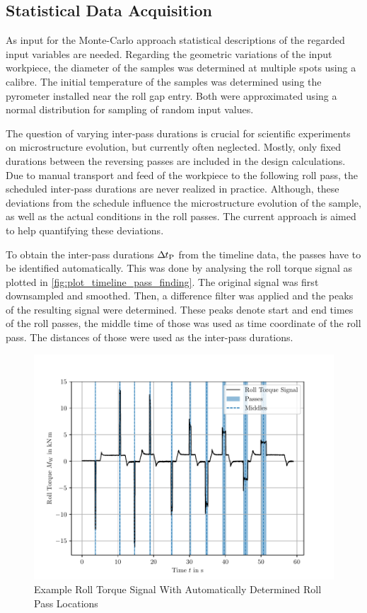 \subsection{Statistical Data Acquisition}\label{subsec:data-acquisition}

As input for the Monte-Carlo approach statistical descriptions of the regarded input variables are needed.
Regarding the geometric variations of the input workpiece, the diameter of the samples was determined at multiple spots using a calibre.
The initial temperature of the samples was determined using the pyrometer installed near the roll gap entry.
Both were approximated using a normal distribution for sampling of random input values.

The question of varying inter-pass durations is crucial for scientific experiments on microstructure evolution, but currently often neglected.
Mostly, only fixed durations between the reversing passes are included in the design calculations.
Due to manual transport and feed of the workpiece to the following roll pass, the scheduled inter-pass durations are never realized in practice.
Although, these deviations from the schedule influence the microstructure evolution of the sample, as well as the actual conditions in the roll passes.
The current approach is aimed to help quantifying these deviations.

To obtain the inter-pass durations ${{\Delta\mspace{-1mu}t}_\mathrm{P}}$ from the timeline data, the passes have to be identified automatically.
This was done by analysing the roll torque signal as plotted in \autoref{fig:plot_timeline_pass_finding}.
The original signal was first downsampled and smoothed.
Then, a difference filter was applied and the peaks of the resulting signal were determined.
These peaks denote start and end times of the roll passes, the middle time of those was used as time coordinate of the roll pass.
The distances of those were used as the inter-pass durations.

\begin{figure}
    \centering
    \includegraphics{img/plot_timeline_pass_finding}
    \caption{Example Roll Torque Signal With Automatically Determined Roll Pass Locations}
    \label{fig:plot_timeline_pass_finding}
\end{figure}

